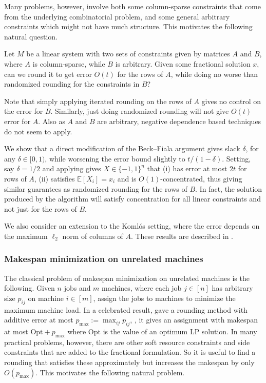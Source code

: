 \documentclass{toc}
\newcommand{\E}{\mathbb{E}}
\begin{document}
Many problems, however, involve both some column-sparse constraints that come from the underlying combinatorial problem, and some general arbitrary constraints which might not have much structure. This motivates the following natural question.

\begin{question} Let $M$ be a linear system with two sets of constraints given by matrices $A$ and $B$, where $A$ is column-sparse, while $B$ is arbitrary. Given some fractional solution $x$, can we round it to
get error $O(t)$ for the rows of $A$, while doing no worse than randomized rounding for the constraints in $B$?
\end{question}
\begin{remark}
Note that simply applying iterated rounding on the rows of $A$ gives no control on the error for $B$. Similarly, just doing randomized rounding will not give $O(t)$ error for $A$. Also as $A$ and $B$ are arbitrary, negative dependence based techniques do not seem to apply.
\end{remark}

%

 We show that a direct modification of the Beck--Fiala argument gives slack $\delta$, for any $\delta \in [0,1)$, while worsening the   error bound slightly to $t/(1-\delta)$. Setting, say $\delta=1/2$ and applying  gives $X \in \{-1,1\}^n$ that (i) has error at most $2t$ for rows of $A$, (ii) satisfies $\E[X_i]=x_i$ and is $O(1)$-concentrated, thus giving similar guarantees as randomized rounding for the rows of $B$.
In fact, the solution produced by the algorithm will satisfy concentration for all linear constraints and not just for the rows of $B$.
%

We also consider an extension to the Koml\'{o}s setting, where the error depends on the maximum $\ell_2$ norm of columns of $A$.
These results are described in .

%
%

%


\subsubsection{Makespan minimization on unrelated machines}
%
The classical problem of makespan minimization on unrelated machines is the following. Given $n$ jobs and $m$ machines, where each job $j \in [n]$ has arbitrary size $p_{ij}$ on machine $i\in [m]$, assign the jobs to machines to minimize the maximum machine load. In a celebrated result, \cite{LST} gave a rounding method with additive error at most $p_{\max} := \max_{ij} p_{ij}$,
\ie, it gives an assignment with makespan at most $\text{Opt} + p_{\max}$ where
$\text{Opt}$ is the value of an optimum LP solution.
In many practical problems, however, there are other soft resource constraints and side constraints that are added to the  fractional formulation.
So it is useful to find a rounding that satisfies these approximately but increases the makespan by only $O(p_{\max})$.
This motivates the following natural problem.
\end{document}
